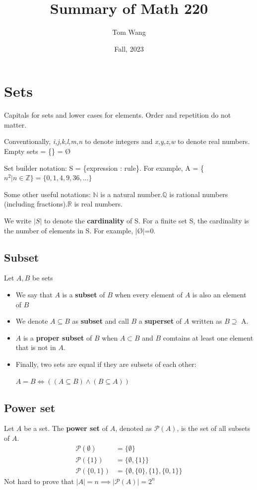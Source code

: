 \documentclass[letterpaper,12pt]{article}
\title{Summary of Math 220}
\author{Tom Wang}
\date{Fall, 2023}
\begin{document}
\maketitle
\thispagestyle{plain}

\section{Sets}

Capitals for sets and lower cases for elements. Order and repetition do not matter. 

Conventionally, \textit{i,j,k,l,m,n} to denote integers and \textit{x,y,z,w} to denote real numbers. Empty sets = \{\} = \O

Set builder notation: S = \{expression : rule\}. For example, A = \{$n^2  | n \in \mathbb{Z} \} = \{0,1,4,9,36,...\} $

Some other useful notations: $\mathbb{N} $ is a natural number.$ \mathbb{Q} $ is rational numbers (including fractions).$ \mathbb{R} $ is real numbers. 

We write $|S|$ to denote the \textbf{cardinality} of S. For a finite set S, the cardinality is the number of elements in S. For example, $|$\O$|$=0.

\subsection{Subset}

Let $A,B$ be sets
\begin{itemize}
    \item We say that $A$ is a \textbf{subset} of $B$ when every element of $A$ is also an element of $B$
    \item We denote $A\subseteq B$ as \textbf{subset} and call $B$ a \textbf{superset} of $A$ written as $B\supseteq$ A.
    \item $A$ is a \textbf{proper subset} of $B$ when $A\subset B$ and $B$ comtains at least one element that is not in $A$.
    \item Finally, two sets are equal if they are subsets of each other:
    
    $A=B \iff ((A\subseteq B)\land (B\subseteq A))$
\end{itemize}

\subsection{Power set}
Let $A$ be a set. The \textbf{power set} of $A$, denoted as $\mathcal{P}(A)$, is the set of all subsets of $A$. 
\begin{align*}
    \mathcal{P}(\emptyset) &= \{\emptyset\} \\
    \mathcal{P}(\{1\}) & = \{\emptyset, \{1\}\}\\
    \mathcal{P}(\{0,1\}) & = \{\emptyset,\{0\}, \{1\},\{0,1\}\}
\end{align*}
Not hard to prove that $|A|=n \implies |\mathcal{P}(A)|=2^n$
\end{document}
